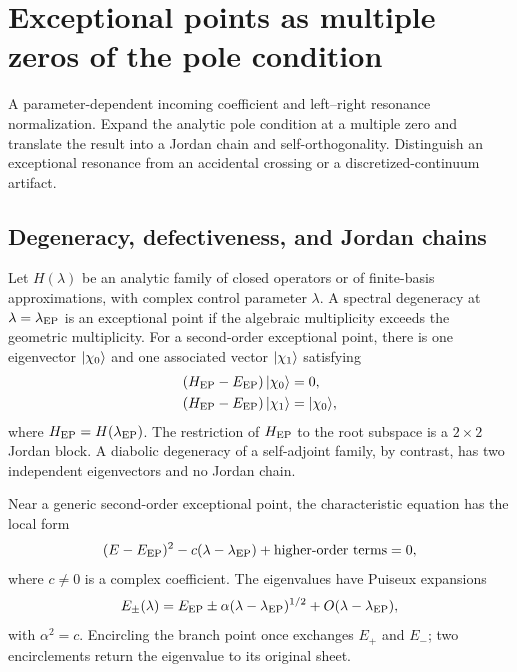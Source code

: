 \section{Exceptional points as multiple zeros of the pole condition}
\label{sec:exceptional-points}

\calculationroute
  {A parameter-dependent incoming coefficient and left--right resonance
  normalization.}
  {Expand the analytic pole condition at a multiple zero and translate the
  result into a Jordan chain and self-orthogonality.}
  {Distinguish an exceptional resonance from an accidental crossing or a
  discretized-continuum artifact.}

\subsection{Degeneracy, defectiveness, and Jordan chains}
\label{subsec:ep-definition}

Let $H(\lambda)$ be an analytic family of closed operators or of finite-basis
approximations, with complex control parameter $\lambda$.  A spectral
degeneracy at $\lambda=\lambda_{\mathrm{EP}}$ is an exceptional point if the
algebraic multiplicity exceeds the geometric multiplicity.  For a second-order
exceptional point, there is one eigenvector $\lvert \chi_0 \rangle$ and one associated
vector $\lvert \chi_1 \rangle$ satisfying
\begin{align}
  \left(H_{\mathrm{EP}}-E_{\mathrm{EP}}\right)
  \lvert \chi_0 \rangle&=0,
  \notag\\
  \left(H_{\mathrm{EP}}-E_{\mathrm{EP}}\right)
  \lvert \chi_1 \rangle&=\lvert \chi_0 \rangle,
  \label{eq:jordan-chain}
\end{align}
where $H_{\mathrm{EP}}=H(\lambda_{\mathrm{EP}})$.  The restriction of
$H_{\mathrm{EP}}$ to the root subspace is a $2\times2$ Jordan block.  A
diabolic degeneracy of a self-adjoint family, by contrast, has two independent
eigenvectors and no Jordan chain.

Near a generic second-order exceptional point, the characteristic equation
has the local form
\begin{equation}
  (E-E_{\mathrm{EP}})^2
  -c(\lambda-\lambda_{\mathrm{EP}})
  +\text{higher-order terms}=0,
  \label{eq:ep-characteristic}
\end{equation}
where $c\ne0$ is a complex coefficient.  The eigenvalues have Puiseux
expansions
\begin{equation}
  E_{\pm}(\lambda)
  =E_{\mathrm{EP}}
  \pm\alpha(\lambda-\lambda_{\mathrm{EP}})^{1/2}
  +O(\lambda-\lambda_{\mathrm{EP}}),
  \label{eq:ep-puiseux}
\end{equation}
with $\alpha^2=c$.  Encircling the branch point once exchanges $E_+$ and
$E_-$; two encirclements return the eigenvalue to its original sheet.

